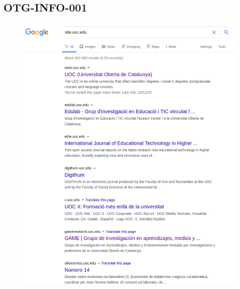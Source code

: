 \documentclass[10pt,a4paper]{article}
\begin{document}
\subsection{OTG-INFO-001}
\label{ann:otg-info-001}
\begin{figure}[ht!]
\centering
  \includegraphics[scale=0.27]{google.png}

\end{figure}
\end{document}
